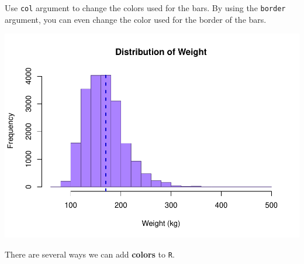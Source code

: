 \documentclass[
]{book}
\newenvironment{Shaded}{\begin{snugshade}}{\end{snugshade}}
\newcommand{\DataTypeTok}[1]{\textcolor[rgb]{0.13,0.29,0.53}{#1}}
\newcommand{\DecValTok}[1]{\textcolor[rgb]{0.00,0.00,0.81}{#1}}
\newcommand{\KeywordTok}[1]{\textcolor[rgb]{0.13,0.29,0.53}{\textbf{#1}}}
\newcommand{\NormalTok}[1]{#1}
\newcommand{\OperatorTok}[1]{\textcolor[rgb]{0.81,0.36,0.00}{\textbf{#1}}}
\newcommand{\StringTok}[1]{\textcolor[rgb]{0.31,0.60,0.02}{#1}}
\begin{document}
Use \texttt{col} argument to change the colors used for the bars. By using the \texttt{border} argument, you can even change the color used for the border of the bars.

\begin{Shaded}
\end{Shaded}

\includegraphics{_main_files/figure-latex/unnamed-chunk-130-1.pdf}

There are several ways we can add \textbf{colors} to \texttt{R}.
\end{document}
